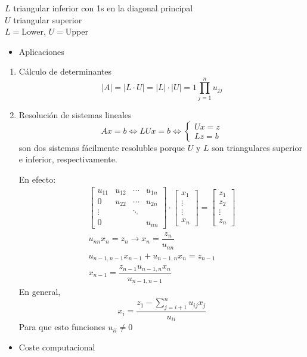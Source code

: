 $L$ triangular inferior con 1s en la diagonal principal\\
$U$ triangular superior\\
$L=$Lower, $U=$Upper
\begin{itemize}[label=\color{red}\textbullet, leftmargin=*]
	\item \color{lightblue}Aplicaciones
\end{itemize}
\begin{enumerate}[label=\color{lightblue}\arabic*)]
	\item Cálculo de determinantes\[ |A|=|L\cdot
	U|=|L|\cdot|U|=1\prod_{j=1}^{n}u_{jj} \]
	\item Resolución de sistemas lineales \[ Ax=b\Longleftrightarrow
	LUx=b\Longleftrightarrow\begin{cases}
		Ux=z\\
		Lz=b
	\end{cases}\]son dos sistemas fácilmente resolubles porque $U$ y $L$ son
	triangulares superior e inferior, respectivamente.
	
	En efecto: \[ \begin{array}{l}
		\begin{bmatrix}
			u_{11} & u_{12} & \cdots & u_{1n}\\
			0 & u_{22} & \cdots & u_{2n}\\
			\vdots & & \ddots& \\
			0 & & & u_{nn}
		\end{bmatrix}\cdot\begin{bmatrix}
			x_1\\
			\vdots\\
			\vdots\\
			x_n
		\end{bmatrix}=\begin{bmatrix}
			z_1\\
			z_2\\
			\vdots\\
			z_n
		\end{bmatrix}\\
		u_{nn}x_n=z_n\longrightarrow x_n=\dfrac{z_n}{u_{nn}}\\
		u_{n-1,n-1}x_{n-1}+u_{n-1,n}x_n=z_{n-1}\\
		x_{n-1}=\dfrac{z_{n-1}u_{n-1,n}x_n}{u_{n-1,n-1}}
	\end{array} \]
	En general, \[ x_i=\dfrac{z_1- \displaystyle\sum_{j=i+1}^{n}u_{ij}x_j}{u_{ii}} \]Para que
	esto funciones $u_{ii}\neq0$
\end{enumerate}
\begin{itemize}[label=\color{red}\textbullet, leftmargin=*]
	\item \color{lightblue}Coste computacional
\end{itemize}
